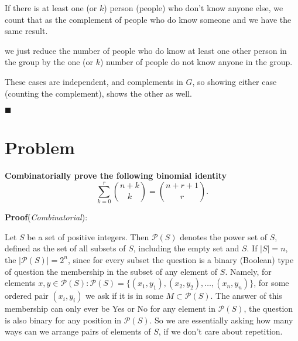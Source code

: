 \documentclass{article}
\begin{document}
        \newline
        
        If there is at least one (or $k$) person (people) who don't know anyone else, we count that as the complement of people who do know someone and we have the same result.
         \newline
         
         we just reduce the number of people who do know at least one other person in the group by the one (or $k$) number of people do not know anyone in the group.
        
        \newline
        
        These cases are independent, and complements in $G$, so showing either case (counting the complement), shows the other as well. 
        
        \medskip
        
        $\blacksquare$
        
        \medskip
        

    \bigskip
    
\section*{Problem}
    \textbf{Combinatorially prove the following binomial identity
$$\sum_{k=0}^{r} {n+k\choose k} = { n + r + 1 \choose r }.$$}
    
    \bigskip

    \textbf{Proof}(\textit{Combinatorial}):
    
    \newline
    
    Let $S$ be a set of positive integers.
    Then $\mathcal{P}(S)$ denotes the power set of $S$, defined as the set of all subsets of $S$, including the empty set and $S$.
    \newline
    If $|S| = n$, the $|\mathcal{P}(S)|=2^{n}$, since for every subset the question is a binary (Boolean) type of question the membership in the subset of any element of $S$.
    \newline
    Namely, for elements $x,y \in \mathcal{P}(S) : \mathcal{P}(S) = \{(x_{1},y_{1}),(x_{2},y_{2}), \hdots,(x_{n},y_{n})\}$, for some ordered pair $(x_{i},y_{i})$ we ask if it is in some $M \subset \mathcal{P}(S)$. 
    \newline
    The answer of this membership can only ever be Yes or No for any element in $\mathcal{P}(S)$, the question is also binary for any position in $\mathcal{P}(S)$.
    \newline
    So we are essentially asking how many ways can we arrange pairs of elements of $S$, if we don't care about repetition.
    \newline
    
    
\end{document}
